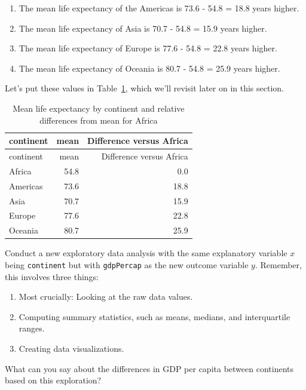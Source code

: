 \documentclass[
  letterpaper,
  DIV=11,
  numbers=noendperiod]{scrreprt}
\providecommand{\tightlist}{%
  \setlength{\itemsep}{0pt}\setlength{\parskip}{0pt}}\usepackage{longtable,booktabs,array}
\theoremstyle{definition}
\theoremstyle{remark}
\begin{document}
\begin{enumerate}
\def\labelenumi{\arabic{enumi}.}
\item
  The mean life expectancy of the Americas is 73.6 - 54.8 = 18.8 years
  higher.
\item
  The mean life expectancy of Asia is 70.7 - 54.8 = 15.9 years higher.
\item
  The mean life expectancy of Europe is 77.6 - 54.8 = 22.8 years higher.
\item
  The mean life expectancy of Oceania is 80.7 - 54.8 = 25.9 years
  higher.
\end{enumerate}

Let's put these values in
Table~\ref{tbl-continent-mean-life-expectancies}, which we'll revisit
later on in this section.

\hypertarget{tbl-continent-mean-life-expectancies}{}
\begin{longtable}[]{@{}lrr@{}}
\caption{\label{tbl-continent-mean-life-expectancies}Mean life
expectancy by continent and relative differences from mean for
Africa}\tabularnewline
\toprule()
continent & mean & Difference versus Africa \\
\midrule()
\endfirsthead
\toprule()
continent & mean & Difference versus Africa \\
\midrule()
\endhead
Africa & 54.8 & 0.0 \\
Americas & 73.6 & 18.8 \\
Asia & 70.7 & 15.9 \\
Europe & 77.6 & 22.8 \\
Oceania & 80.7 & 25.9 \\
\bottomrule()
\end{longtable}

\begin{tcolorbox}[enhanced jigsaw, coltitle=black, toprule=.15mm, bottomtitle=1mm, breakable, leftrule=.75mm, title={{🎯} Learning Check 5.3}, opacitybacktitle=0.6, colback=white, rightrule=.15mm, opacityback=0, toptitle=1mm, colbacktitle=quarto-callout-tip-color!10!white, colframe=quarto-callout-tip-color-frame, titlerule=0mm, arc=.35mm, bottomrule=.15mm, left=2mm]
Conduct a new exploratory data analysis with the same explanatory
variable \(x\) being \texttt{continent} but with \texttt{gdpPercap} as
the new outcome variable \(y\). Remember, this involves three things:

\begin{enumerate}
\def\labelenumi{\arabic{enumi}.}
\tightlist
\item
  Most crucially: Looking at the raw data values.
\item
  Computing summary statistics, such as means, medians, and
  interquartile ranges.
\item
  Creating data visualizations.
\end{enumerate}

What can you say about the differences in GDP per capita between
continents based on this exploration?
\end{tcolorbox}
\end{document}
